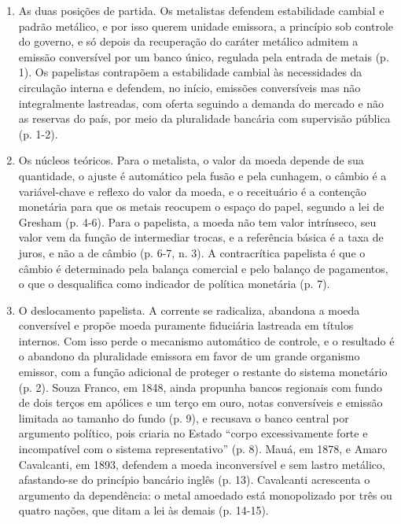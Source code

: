 \begin{enumerate}[leftmargin=*,nosep]
\item As duas posições de partida. Os metalistas defendem estabilidade cambial
e padrão metálico, e por isso querem unidade emissora, a princípio sob controle
do governo, e só depois da recuperação do caráter metálico admitem a emissão
conversível por um banco único, regulada pela entrada de metais (p. 1). Os
papelistas contrapõem a estabilidade cambial às necessidades da circulação
interna e defendem, no início, emissões conversíveis mas não integralmente
lastreadas, com oferta seguindo a demanda do mercado e não as reservas do país,
por meio da pluralidade bancária com supervisão pública (p. 1-2).

\item Os núcleos teóricos. Para o metalista, o valor da moeda depende de sua
quantidade, o ajuste é automático pela fusão e pela cunhagem, o câmbio é a
variável-chave e reflexo do valor da moeda, e o receituário é a contenção
monetária para que os metais reocupem o espaço do papel, segundo a lei de
Gresham (p. 4-6). Para o papelista, a moeda não tem valor intrínseco, seu valor
vem da função de intermediar trocas, e a referência básica é a taxa de juros, e
não a de câmbio (p. 6-7, n. 3). A contracrítica papelista é que o câmbio é
determinado pela balança comercial e pelo balanço de pagamentos, o que o
desqualifica como indicador de política monetária (p. 7).

\item O deslocamento papelista. A corrente se radicaliza, abandona a moeda
conversível e propõe moeda puramente fiduciária lastreada em títulos internos.
Com isso perde o mecanismo automático de controle, e o resultado é o abandono
da pluralidade emissora em favor de um grande organismo emissor, com a função
adicional de proteger o restante do sistema monetário (p. 2). Souza Franco, em
1848, ainda propunha bancos regionais com fundo de dois terços em apólices e um
terço em ouro, notas conversíveis e emissão limitada ao tamanho do fundo (p. 9),
e recusava o banco central por argumento político, pois criaria no Estado
``corpo excessivamente forte e incompatível com o sistema representativo''
(p. 8). Mauá, em 1878, e Amaro Cavalcanti, em 1893, defendem a moeda
inconversível e sem lastro metálico, afastando-se do princípio bancário inglês
(p. 13). Cavalcanti acrescenta o argumento da dependência: o metal amoedado está
monopolizado por três ou quatro nações, que ditam a lei às demais (p. 14-15).


\end{enumerate}
